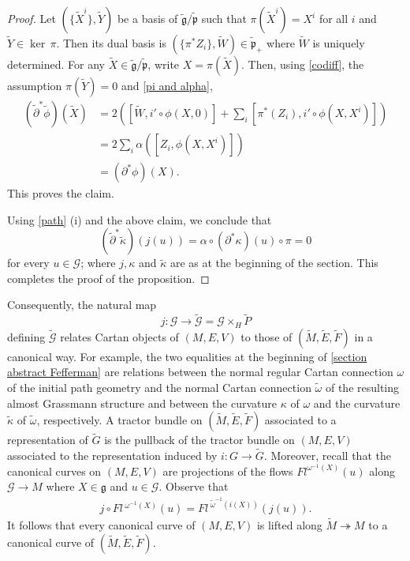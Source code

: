 \documentclass[11pt]{amsart}
\begin{document}
\begin{proof}
Let $(\{\tilde X^i\},\tilde Y)$ be a basis of $\tilde{\mathfrak g}/\tilde{\mathfrak p}$ such that $\pi(\tilde X^i)=X^i$ for all $i$ and $\tilde Y\in\ker\,\pi$. Then its dual basis is $(\{\pi^*Z_i\},\tilde W)\in\tilde{\mathfrak p}_+$ where $\tilde W$ is uniquely determined. For any $\tilde X\in\tilde{\mathfrak g}/\tilde{\mathfrak p}$, write $X=\pi(\tilde X)$. Then, using \eqref{codiff}, the assumption $\pi(\tilde Y)=0$ and \eqref{pi and alpha},
\begin{align*}
   (\tilde\partial^*\tilde\phi) (\tilde X)&=2\left([\tilde W,i'\circ\phi(X,0)]+
   \sum_i[\pi^*(Z_i),i'\circ\phi(X,X^i)]\right)\\
   &=2\sum_i\alpha([Z_i,\phi(X,X^i)])\\
   &=(\partial^*\phi)(X).
\end{align*}
This proves the claim.

Using \cref{path} (i) and the above claim, we conclude that
\[(\tilde\partial^*\tilde\kappa)(j(u))=\alpha\circ(\partial^*\kappa)(u)\circ\pi=0\]
for every $u\in\mathcal G$; where $j,\kappa$ and $\tilde\kappa$ are as at the beginning of the section. This completes the proof of the proposition.
\end{proof}
Consequently, the natural map
\[j:\mathcal G\to\tilde{\mathcal G}=\mathcal G\times_H\tilde P\]
defining $\tilde{\mathcal G}$ relates Cartan objects of $(M,E,V)$ to those of $(\tilde M,\tilde E,\tilde F)$ in a canonical way. For example, the two equalities at the beginning of \cref{section abstract Fefferman} are relations between the normal regular Cartan connection $\omega$ of the initial path geometry and the normal Cartan connection $\tilde\omega$ of the resulting almost Grassmann structure and between the curvature $\kappa$ of $\omega$ and the curvature $\tilde\kappa$ of $\tilde\omega$, respectively. A tractor bundle on $(\tilde M,\tilde E,\tilde F)$ associated to a representation of $\tilde G$ is the pullback of the tractor bundle on $(M,E,V)$ associated to the representation induced by $i:G\to\tilde G$. Moreover, recall that the canonical curves on $(M,E,V)$ are projections of the flows $Fl^{\omega^{-1}(X)}(u)$ along $\mathcal G\to M$ where $X\in\mathfrak g$ and $u\in\mathcal G$. Observe that 
\begin{align*}
j\circ Fl\,^{\omega^{-1}(X)}(u)
=Fl\,^{{\tilde\omega}^{-1}(i(X))}
(j(u)).
\end{align*} 
It follows that every canonical curve of $(M,E,V)$ is lifted along $\tilde M\twoheadrightarrow M$ to a canonical curve of $(\tilde M,\tilde E,\tilde F)$.
\end{document}
